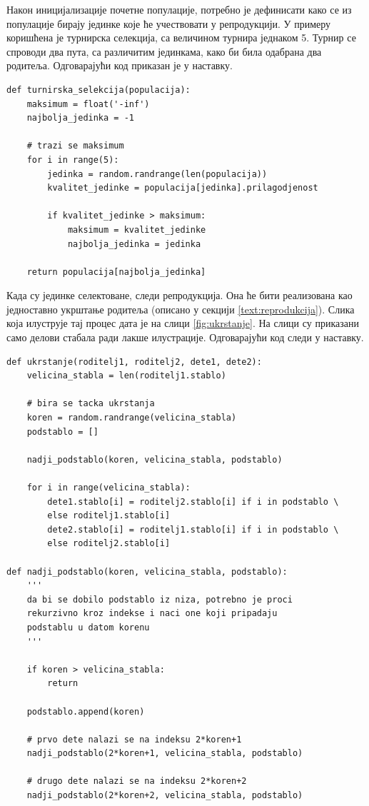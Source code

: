 \documentclass[a4paper]{article}
\begin{document}
Након иницијализације почетне популације, потребно је дефинисати како се из популације бирају јединке које ће учествовати у репродукцији. У примеру коришћена је турнирска селекција, са величином турнира једнаком 5. Турнир се спроводи два пута, са различитим јединкама, како би била одабрана два родитеља. Одговарајући код приказан је у наставку.

\bigskip
\begin{lstlisting}[frame=single]
def turnirska_selekcija(populacija):
    maksimum = float('-inf')
    najbolja_jedinka = -1

    # trazi se maksimum
    for i in range(5):
        jedinka = random.randrange(len(populacija))
        kvalitet_jedinke = populacija[jedinka].prilagodjenost

        if kvalitet_jedinke > maksimum:
            maksimum = kvalitet_jedinke
            najbolja_jedinka = jedinka

    return populacija[najbolja_jedinka]
\end{lstlisting}

Када су јединке селектоване, следи репродукција. Она ће бити реализована као једноставно укрштање родитеља (описано у секцији \ref{text:reprodukcija}). Слика која илуструје тај процес дата је на слици \ref{fig:ukrstanje}. На слици су приказани само делови стабала ради лакше илустрације. Одговарајући код следи у наставку.

\bigskip
\begin{lstlisting}[frame=single]
def ukrstanje(roditelj1, roditelj2, dete1, dete2):
    velicina_stabla = len(roditelj1.stablo)
    
    # bira se tacka ukrstanja
    koren = random.randrange(velicina_stabla)
    podstablo = []
    
    nadji_podstablo(koren, velicina_stabla, podstablo)

    for i in range(velicina_stabla):
        dete1.stablo[i] = roditelj2.stablo[i] if i in podstablo \
        else roditelj1.stablo[i]
        dete2.stablo[i] = roditelj1.stablo[i] if i in podstablo \
        else roditelj2.stablo[i]
        
def nadji_podstablo(koren, velicina_stabla, podstablo):
    ''' 
    da bi se dobilo podstablo iz niza, potrebno je proci 
    rekurzivno kroz indekse i naci one koji pripadaju
    podstablu u datom korenu
    '''
    
    if koren > velicina_stabla:
        return

    podstablo.append(koren)
    
    # prvo dete nalazi se na indeksu 2*koren+1
    nadji_podstablo(2*koren+1, velicina_stabla, podstablo)
    
    # drugo dete nalazi se na indeksu 2*koren+2
    nadji_podstablo(2*koren+2, velicina_stabla, podstablo)
\end{lstlisting}
\end{document}
